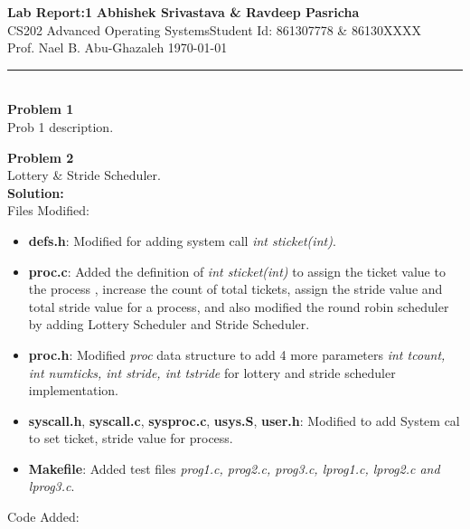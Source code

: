 \documentclass[a4paper, 10pt]{article}
\begin{document}
\noindent
\large\textbf{Lab Report:1} \hfill \textbf{Abhishek Srivastava \& Ravdeep Pasricha} \\
\normalsize CS202 Advanced Operating Systems\hfill Student Id: 861307778 \& 86130XXXX \\
Prof. Nael B. Abu-Ghazaleh \hfill \today \\
\hrule

\noindent
\\
\large\textbf{Problem 1}\\
Prob 1 description.\\

\newpage

\noindent
\large\textbf{Problem 2}\\
Lottery \& Stride Scheduler.\\
 
\noindent
\large\textbf{Solution:}\\
Files Modified:
\begin{itemize}
	\item \textbf{defs.h}: Modified for adding system call  \emph{int sticket(int)}.
	\item \textbf{proc.c}:  Added the definition of \emph{int sticket(int)} to assign the ticket value to the process , increase the count of total tickets, assign the stride value and total stride value for a process, and also modified the round robin scheduler by adding Lottery Scheduler and Stride Scheduler. 
	\item \textbf{proc.h}: Modified \emph{proc} data structure to add 4 more parameters \emph{int tcount,	int numticks, int stride,	int tstride} for lottery and stride scheduler implementation.
	\item \textbf{syscall.h}, \textbf{syscall.c}, \textbf{sysproc.c}, \textbf{usys.S}, \textbf{user.h}: Modified to add System cal to set ticket, stride value for process.
	\item \textbf{Makefile}:  Added test files \emph{prog1.c, prog2.c, prog3.c, lprog1.c, lprog2.c and lprog3.c}.\\
\end{itemize}
Code Added:
\end{document}
